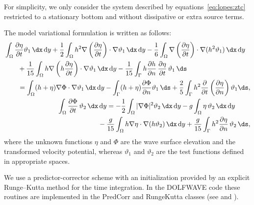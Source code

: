 For simplicity, we only consider the system described by
equations~\eqref{eq:lopes:ztc} restricted to a stationary
bottom and without dissipative
or extra source terms.

The model variational formulation is written as follows:
\begin{subequations}\label{eq:lopes:varform}
\begin{align}
\begin{split}
&\displaystyle \int_\Omega\frac{\partial \eta}{\partial t}\vartheta_1\, \dx\, \mathrm{d}y
  +\frac{1}{2}\int_\Omega
  h^2\nabla\left(\frac{\partial \eta}{\partial t}\right)\cdot\nabla\vartheta_1\,
  \dx\, \mathrm{d}y- \frac{1}{6}\int_\Omega \nabla\left(
  \frac{\partial \eta}{\partial t}\right)\cdot\nabla(h^2\vartheta_1)\,
  \dx\, \mathrm{d}y\\
 &\quad \quad\displaystyle +
  \frac{1}{15}\int_\Omega
  h\nabla\left(h\frac{\partial \eta}{\partial t}\right)\cdot
  \nabla\vartheta_1\, \dx\, \mathrm{d}y- \frac{1}{15}\int_\Gamma
  h\frac{\partial h}{\partial n}\,\frac{\partial \eta}{\partial t}\,\vartheta_1\, \ds
  \\ &\quad\quad=\displaystyle
  \int_\Omega(h+\eta)\nabla\Phi\cdot\nabla\vartheta_1\,
  \dx\, \mathrm{d}y -\int_\Gamma(h+\eta)\frac{\partial \Phi}{\partial n}\vartheta_1\, \ds
  +\frac{2}{5}\int_\Gamma
  h^2\frac{\partial }{\partial t}\left(\frac{\partial \eta}{\partial n}\right)\vartheta_1 \ds,
\vspace{0.3cm}
\end{split} \\
\begin{split}
&\displaystyle \int_\Omega \frac{\partial \Phi}{\partial t}\,\vartheta_2\,
  \dx\, \mathrm{d}y= -\frac{1}{2}\int_\Omega|\nabla\Phi|^2\vartheta_2\,
  \dx\, \mathrm{d}y -g\int_\Omega \eta\,\vartheta_2\,
  \dx\, \mathrm{d}y\\
&\qquad\qquad\qquad\displaystyle-\frac{g}{15}\int_\Omega
  h\nabla\eta\cdot\nabla(h\vartheta_2)\, \dx\, \mathrm{d}y
  +\frac{g}{15}\int_\Gamma h^2\frac{\partial \eta}{\partial n}\,\vartheta_2\,
  \ds,
\end{split}
\end{align}
\end{subequations}
where the unknown functions $\eta$ and $\Phi$ are the wave
surface elevation and the transformed velocity potential,
whereas $\vartheta_1$ and $\vartheta_2$ are the test
functions defined in appropriate spaces.

We use a predictor-corrector  scheme with
an initialization provided by an explicit
Runge--Kutta method for the time integration. In
the DOLFWAVE code these routines are implemented in the PredCorr and
RungeKutta classes (see 
and ).

